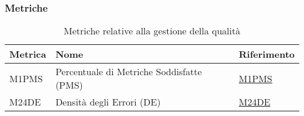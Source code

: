 \subsubsection{Metriche} 
\begin{table}[H]
    \centering
    \begin{tabular}{|C{3cm}|C{4cm}|C{3cm}|}
    \hline
    \textbf{Metrica} & \textbf{Nome} & \textbf{Riferimento} \\
    \hline \hline
    M1PMS & Percentuale di Metriche Soddisfatte (PMS) &  \hyperlink{item:M1PMS}{M1PMS} \\
    M24DE & Densità degli Errori (DE) &  \hyperlink{item:M24DE}{M24DE} \\
    \hline
    \end{tabular}
    \caption{Metriche relative alla gestione della qualità}
\end{table}

